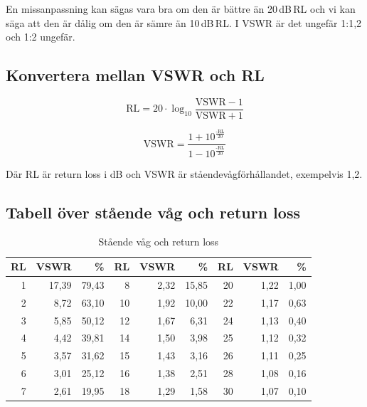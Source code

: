 En missanpassning kan sägas vara bra om den är bättre än 20\,dB\,RL och vi kan
säga att den är dålig om den är sämre än 10\,dB\,RL. I VSWR är det ungefär
1:1,2 och 1:2 ungefär.

\subsection{Konvertera mellan VSWR och RL}

\begin{equation}
	\text{RL} = 20 \cdot \log_{10} \frac{\text{VSWR}-1}{\text{VSWR}+1}
\end{equation}

\begin{equation}
	\text{VSWR} = \frac{1+10^\frac{\text{-RL}}{20}}{1-10^\frac{\text{-RL}}{20}}
\end{equation}

Där RL är return loss i dB och VSWR är ståendevågförhållandet, exempelvis 1,2.

\subsection{Tabell över stående våg och return loss}

\begin{table}[H]
\centering
\begin{tabular}{rrr|rrr|rrr}
	\textbf{RL} & \textbf{VSWR} & \textbf{\%} & \textbf{RL} & \textbf{VSWR} & \textbf{\%} & \textbf{RL} & \textbf{VSWR} & \textbf{\%} \\ \hline
	          1 &         17,39 &       79,43 &           8 &          2,32 &       15,85 &          20 &          1,22 &        1,00 \\
	          2 &          8,72 &       63,10 &          10 &          1,92 &       10,00 &          22 &          1,17 &        0,63 \\
	          3 &          5,85 &       50,12 &          12 &          1,67 &        6,31 &          24 &          1,13 &        0,40 \\
	          4 &          4,42 &       39,81 &          14 &          1,50 &        3,98 &          25 &          1,12 &        0,32 \\
	          5 &          3,57 &       31,62 &          15 &          1,43 &        3,16 &          26 &          1,11 &        0,25 \\
	          6 &          3,01 &       25,12 &          16 &          1,38 &        2,51 &          28 &          1,08 &        0,16 \\
	          7 &          2,61 &       19,95 &          18 &          1,29 &        1,58 &          30 &          1,07 &        0,10
\end{tabular}
\caption{Stående våg och return loss}
\label{tab:vswr-rl}
\end{table}

